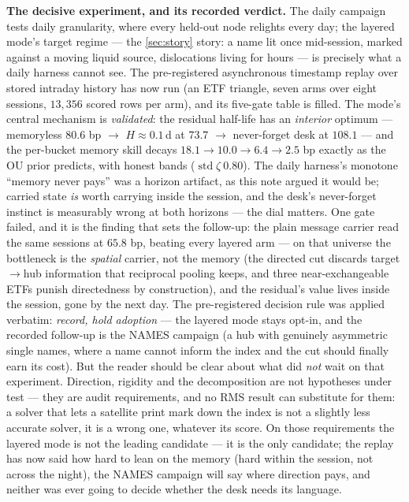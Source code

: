 \documentclass[11pt]{article}
\begin{document}
\textbf{The decisive experiment, and its recorded verdict.}  The daily
campaign tests daily granularity, where every held-out node
relights every day; the layered mode's target regime --- the
\cref{sec:story} story: a name lit once mid-session, marked against a
moving liquid source, dislocations living for hours --- is precisely what
a daily harness cannot see.  The pre-registered asynchronous timestamp
replay over stored intraday history has now run (an ETF triangle, seven
arms over eight sessions, $13{,}356$ scored rows per arm), and its
five-gate table is filled.  The mode's central mechanism is
\emph{validated}: the residual half-life has an \emph{interior} optimum
--- memoryless $80.6$ bp $\to$ $H\approx0.1$\,d at $73.7$ $\to$
never-forget desk at $108.1$ --- and the per-bucket memory skill decays
$18.1\to10.0\to6.4\to2.5$ bp exactly as the OU prior predicts, with
honest bands ($\operatorname{std}\zeta\ 0.80$).  The daily harness's
monotone ``memory never pays'' was a horizon artifact, as this note
argued it would be; carried state \emph{is} worth carrying inside the
session, and the desk's never-forget instinct is measurably wrong at
both horizons --- the dial matters.  One gate failed, and it is the
finding that sets the follow-up: the plain message carrier read the same
sessions at $65.8$ bp, beating every layered arm --- on that universe
the bottleneck is the \emph{spatial} carrier, not the memory (the
directed cut discards target$\to$hub information that reciprocal pooling
keeps, and three near-exchangeable ETFs punish directedness by
construction), and the residual's value lives inside the session, gone
by the next day.  The pre-registered decision rule was applied verbatim:
\emph{record, hold adoption} --- the layered mode stays opt-in, and the
recorded follow-up is the NAMES campaign (a hub with genuinely
asymmetric single names, where a name cannot inform the index and the
cut should finally earn its cost).  But the reader should be clear
about what did \emph{not} wait on that experiment.  Direction, rigidity
and the decomposition are not hypotheses under test --- they are audit
requirements, and no RMS result can substitute for them: a solver that
lets a satellite print mark down the index is not a slightly less
accurate solver, it is a wrong one, whatever its score.  On those
requirements the layered mode is not the leading candidate --- it is the
only candidate; the replay has now said how hard to lean on the memory
(hard within the session, not across the night), the NAMES campaign will
say where direction pays, and neither was ever going to decide whether
the desk needs its language.
\end{document}
